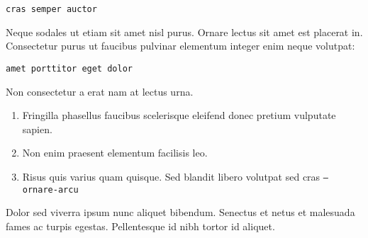 \documentclass[9pt]{innovativeinnovation-cheatsheet}
\begin{document}
\begin{multicols*}{3}
\begin{lstlisting}
cras semper auctor
\end{lstlisting}


Neque sodales ut etiam sit amet nisl purus. Ornare lectus sit amet est
placerat in. Consectetur purus ut faucibus pulvinar elementum integer enim
neque volutpat:

\begin{lstlisting}
amet porttitor eget dolor
\end{lstlisting}


Non consectetur a erat nam at lectus urna.

\begin{enumerate}
  \item Fringilla phasellus faucibus scelerisque eleifend donec pretium
        vulputate sapien.
  \item Non enim praesent elementum facilisis leo.
  \item Risus quis varius quam quisque. Sed blandit libero volutpat sed cras
        \texttt{--ornare-arcu}
\end{enumerate}

Dolor sed viverra ipsum nunc aliquet bibendum. Senectus et netus et malesuada
fames ac turpis egestas. Pellentesque id nibh tortor id aliquet.

\vfill


\end{multicols*}
\end{document}
